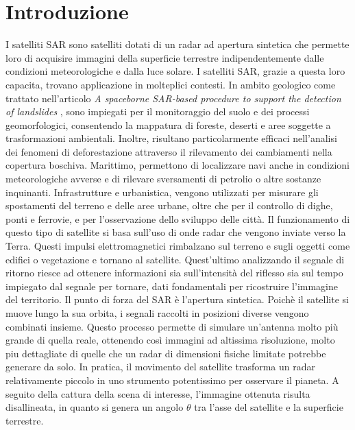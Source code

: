 
\chapter{Introduzione}

I satelliti SAR sono satelliti dotati di un radar ad apertura sintetica che permette
loro di acquisire immagini della superficie terrestre indipendentemente dalle 
condizioni meteorologiche e dalla luce solare. I satelliti SAR, grazie a questa loro 
capacita, trovano applicazione in molteplici contesti. In ambito geologico come trattato nell'articolo \textit{A spaceborne SAR-based procedure to support the detection of landslides} \cite{nhess-20-2379-2020}, 
sono impiegati per il monitoraggio del suolo e dei processi 
geomorfologici, consentendo la mappatura di foreste, deserti e aree soggette a 
trasformazioni ambientali. Inoltre, risultano particolarmente efficaci nell’analisi 
dei fenomeni di deforestazione attraverso il rilevamento dei cambiamenti nella 
copertura boschiva. Marittimo, permettono di localizzare navi anche in condizioni 
meteorologiche avverse e di rilevare sversamenti di petrolio o altre sostanze 
inquinanti. Infrastrutture e urbanistica, vengono utilizzati per misurare gli 
spostamenti del terreno e delle aree urbane, oltre che per il controllo di dighe, 
ponti e ferrovie, e per l’osservazione dello sviluppo delle città. Il funzionamento 
di questo tipo di satellite si basa sull'uso di  onde radar che vengono inviate verso la Terra. 
Questi impulsi elettromagnetici rimbalzano sul terreno e sugli 
oggetti come edifici o vegetazione e tornano al satellite. Quest'ultimo analizzando il segnale di 
ritorno riesce ad ottenere informazioni sia sull'intensità del riflesso sia sul tempo impiegato 
dal segnale per tornare, dati fondamentali per ricostruire l'immagine del territorio. Il punto 
di forza del SAR è l'apertura sintetica. Poichè il satellite si muove lungo la sua orbita, i 
segnali raccolti in posizioni diverse vengono combinati insieme. Questo processo permette di 
simulare un'antenna molto più grande di quella reale, ottenendo così immagini ad altissima 
risoluzione, molto piu dettagliate di quelle che un radar di dimensioni fisiche limitate potrebbe 
generare da solo. In pratica, il movimento del satellite trasforma un radar relativamente piccolo 
in uno strumento potentissimo per osservare il pianeta. 
A seguito della cattura della scena di interesse, l’immagine ottenuta risulta disallineata, 
in quanto si genera un angolo $\theta$ tra l’asse del satellite e la superficie terrestre. 
